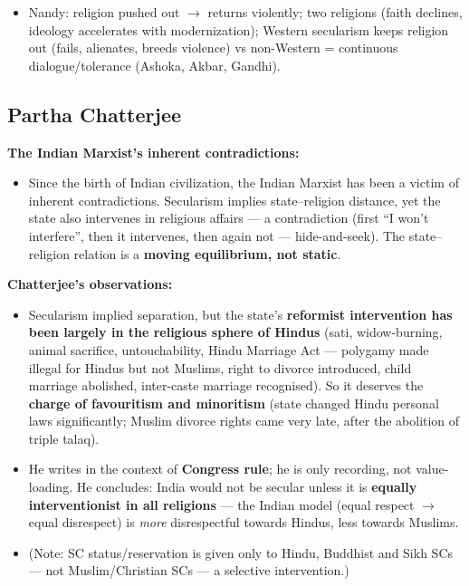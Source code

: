 \begin{QuickRevision}
\begin{itemize}
\item Nandy: religion pushed out $\rightarrow$ returns violently; two religions (faith declines, ideology accelerates with modernization); Western secularism keeps religion out (fails, alienates, breeds violence) vs non-Western = continuous dialogue/tolerance (Ashoka, Akbar, Gandhi).
\end{itemize}
\end{QuickRevision}

\sectiondivider

\subsection{Partha Chatterjee}

\begin{CriticalPoint}
\textbf{The Indian Marxist's inherent contradictions:}
\begin{itemize}
\item Since the birth of Indian civilization, the Indian Marxist has been a victim of inherent contradictions. Secularism implies state--religion distance, yet the state also intervenes in religious affairs --- a contradiction (first ``I won't interfere'', then it intervenes, then again not --- hide-and-seek). The state--religion relation is a \textbf{moving equilibrium, not static}.
\end{itemize}
\end{CriticalPoint}

\begin{DataFact}
\textbf{Chatterjee's observations:}
\begin{itemize}
\item Secularism implied separation, but the state's \textbf{reformist intervention has been largely in the religious sphere of Hindus} (sati, widow-burning, animal sacrifice, untouchability, Hindu Marriage Act --- polygamy made illegal for Hindus but not Muslims, right to divorce introduced, child marriage abolished, inter-caste marriage recognised). So it deserves the \textbf{charge of favouritism and minoritism} (state changed Hindu personal laws significantly; Muslim divorce rights came very late, after the abolition of triple talaq).
\item He writes in the context of \textbf{Congress rule}; he is only recording, not value-loading. He concludes: India would not be secular unless it is \textbf{equally interventionist in all religions} --- the Indian model (equal respect $\rightarrow$ equal disrespect) is \textit{more} disrespectful towards Hindus, less towards Muslims.
\item (Note: SC status/reservation is given only to Hindu, Buddhist and Sikh SCs --- not Muslim/Christian SCs --- a selective intervention.)
\end{itemize}
\end{DataFact}

